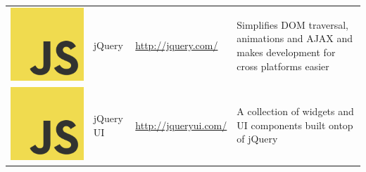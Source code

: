 \documentclass[12pt, a4paper]{article}
\begin{document}
\begin{table}[H]
{\begin{tabular}{|m{0.3cm}m{2.4cm}m{5.6cm}m{8.8cm}|}
\includegraphics[scale=0.02]{js.png}& jQuery & \href{http://jquery.com/}{http://jquery.com/} & Simplifies DOM traversal, animations and AJAX and makes development for cross platforms easier \\
\includegraphics[scale=0.02]{js.png}& jQuery UI & \href{http://jqueryui.com/}{http://jqueryui.com/} & A collection of widgets and UI components built ontop of jQuery \\

\end{tabular}}
\end{table}
\end{document}
